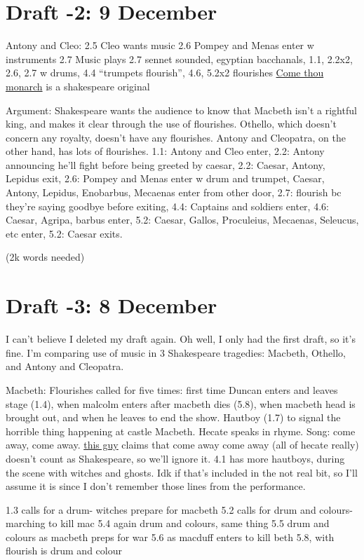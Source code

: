 \documentclass[12pt]{article}[titlepage]
\newcommand{\say}[1]{``#1''}
\newcommand{\1}{\={a}}
\newcommand{\2}{\={e}}
\newcommand{\3}{\={\i}}
\newcommand{\4}{\=o}
\newcommand{\5}{\=u}
\newcommand{\6}{\={A}}
\renewcommand{\,}{\textsuperscript{,}}
\begin{document}
\section{Draft -2: 9 December}
Antony and Cleo:
2.5 Cleo wants music
2.6 Pompey and Menas enter w instruments
2.7 Music plays
2.7 sennet sounded, egyptian bacchanals, 
1.1, 2.2x2, 2.6, 2.7 w drums, 4.4 \say{trumpets flourish}, 4.6, 5.2x2 flourishes
\href{http://www.lieder.net/lieder/get_text.html?TextId=18775}{Come thou monarch}  is a shakespeare original 

Argument: Shakespeare wants the audience to know that Macbeth isn't a rightful king, and makes it clear through the use of flourishes.
Othello, which doesn't concern any royalty, doesn't have any flourishes.
Antony and Cleopatra, on the other hand, has lots of flourishes.
1.1: Antony and Cleo enter,
2.2: Antony announcing he'll fight before being greeted by caesar,
2.2: Caesar, Antony, Lepidus exit,
2.6: Pompey and Menas enter w drum and trumpet, Caesar, Antony, Lepidus, Enobarbus, Mecaenas enter from other door,
2.7: flourish bc they're saying goodbye before exiting,
4.4: Captains and soldiers enter,
4.6: Caesar, Agripa, barbus enter,
5.2: Caesar, Gallos, Proculeius, Mecaenas, Seleucus, etc enter,
5.2: Caesar exits.

(2k words needed)
\section{Draft -3: 8 December}
I can't believe I deleted my draft again.
Oh well, I only had the first draft, so it's fine.
I'm comparing use of music in 3 Shakespeare tragedies: Macbeth, Othello, and Antony and Cleopatra.

Macbeth:
Flourishes called for five times: first time Duncan enters and leaves stage (1.4), when malcolm enters after macbeth dies (5.8), when macbeth head is brought out, and when he leaves to end the show.
Hautboy (1.7) to signal the horrible thing happening at castle Macbeth.
Hecate speaks in rhyme.
Song: come away, come away.
\href{https://doi.org/10.1093/mq/XLVII.1.22}{this guy} claims that come away come away (all of hecate really) doesn't count as Shakespeare, so we'll ignore it.
4.1 has more hautboys, during the scene with witches and ghosts.
Idk if that's included in the not real bit, so I'll assume it is since I don't remember those lines from the performance.

1.3 calls for a drum- witches prepare for macbeth
5.2 calls for drum and colours- marching to kill mac
5.4 again drum and colours, same thing
5.5 drum and colours as macbeth preps for war
5.6 as macduff enters to kill beth
5.8, with flourish is drum and colour
\end{document}
